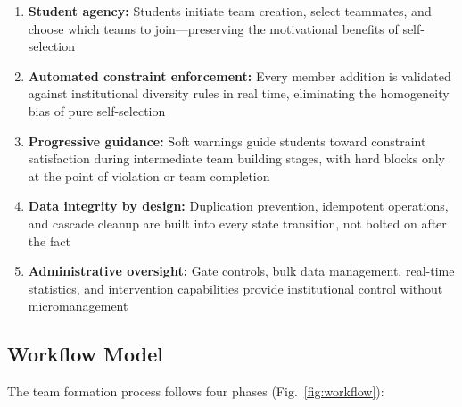 \documentclass[conference]{IEEEtran}
\begin{document}
\begin{enumerate}[noitemsep,topsep=3pt]
    \item \textbf{Student agency:} Students initiate team creation, select teammates, and choose which teams to join---preserving the motivational benefits of self-selection~\cite{chapman2006}
    \item \textbf{Automated constraint enforcement:} Every member addition is validated against institutional diversity rules in real time, eliminating the homogeneity bias of pure self-selection~\cite{bacon2004}
    \item \textbf{Progressive guidance:} Soft warnings guide students toward constraint satisfaction during intermediate team building stages, with hard blocks only at the point of violation or team completion
    \item \textbf{Data integrity by design:} Duplication prevention, idempotent operations, and cascade cleanup are built into every state transition, not bolted on after the fact
    \item \textbf{Administrative oversight:} Gate controls, bulk data management, real-time statistics, and intervention capabilities provide institutional control without micromanagement
\end{enumerate}

\subsection{Workflow Model}

The team formation process follows four phases (Fig.~\ref{fig:workflow}):
\end{document}
